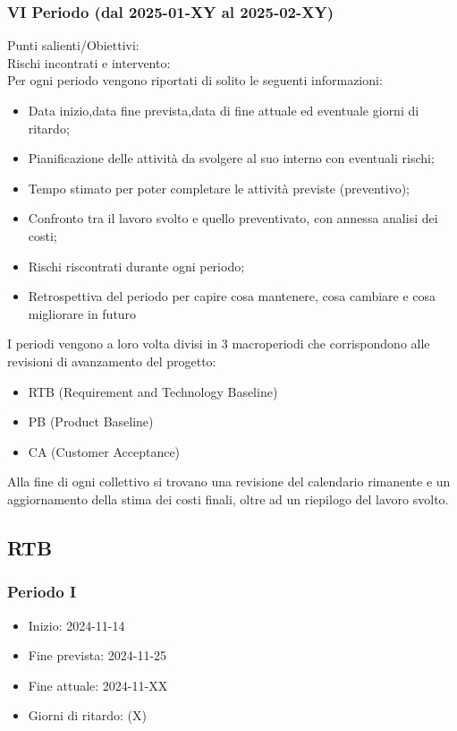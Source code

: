         \subsubsection{VI Periodo (dal 2025-01-XY al 2025-02-XY)}
        Punti salienti/Obiettivi: \\
        Rischi incontrati e intervento:
\\[20pts]
Per ogni periodo vengono riportati di solito le seguenti informazioni:
\begin{itemize}
    \item Data inizio,data fine prevista,data di fine attuale ed eventuale giorni di ritardo;
    \item Pianificazione delle attività da svolgere al suo interno con eventuali rischi;
    \item Tempo stimato per poter completare le attività previste (preventivo);
    \item Confronto tra il lavoro svolto e quello preventivato, con annessa analisi dei costi;
    \item Rischi riscontrati durante ogni periodo;
    \item Retrospettiva del periodo per capire cosa mantenere, cosa cambiare e cosa migliorare in futuro
\end{itemize}

I periodi vengono a loro volta divisi in 3 macroperiodi che corrispondono alle revisioni di avanzamento del progetto:
\begin{itemize}
    \item RTB (Requirement and Technology Baseline)
    \item PB (Product Baseline)
    \item CA (Customer Acceptance)
\end{itemize}
Alla fine di ogni collettivo si trovano una revisione del calendario rimanente e un aggiornamento della stima dei costi finali, oltre ad un riepilogo del lavoro svolto.
\subsection{RTB}
\subsubsection{Periodo I}
\begin{itemize}
    \item Inizio: 2024-11-14
    \item Fine prevista: 2024-11-25
    \item Fine attuale: 2024-11-XX
    \item Giorni di ritardo: (X)
\end{itemize}
